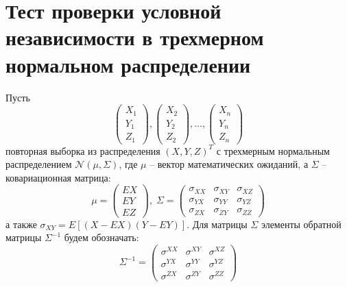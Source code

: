 \section{Тест проверки условной независимости в трехмерном нормальном распределении}
Пусть
$$
\begin{pmatrix}
    X_1\\
    Y_1 \\
    Z_1
\end{pmatrix}, \begin{pmatrix}
    X_2\\
    Y_2 \\
    Z_2
\end{pmatrix}, \ldots, 
\begin{pmatrix}
    X_n \\
    Y_n \\
    Z_n
\end{pmatrix}
$$
повторная выборка из распределения $(X,Y,Z)^T$ с трехмерным нормальным распределением $\mathcal{N}(\mu, \Sigma)$,
где $\mu$ -- вектор математических ожиданий, а $\Sigma$ -- ковариационная матрица:
$$
\mu = \begin{pmatrix}
    EX \\ EY \\ EZ
\end{pmatrix}, 
\;
\Sigma = \begin{pmatrix}
    \sigma_{XX} & \sigma_{XY} & \sigma_{XZ} \\
    \sigma_{YX} & \sigma_{YY} & \sigma_{YZ} \\
    \sigma_{ZX} & \sigma_{ZY} & \sigma_{ZZ} 
\end{pmatrix}
$$
а также $\sigma_{XY}=E[(X-EX)(Y-EY)]$.
Для матрицы $\Sigma$ элементы обратной матрицы $\Sigma^{-1}$ будем обозначать:
$$
\Sigma^{-1} =
\begin{pmatrix}
    \sigma^{XX} & \sigma^{XY} & \sigma^{XZ} \\
    \sigma^{YX} & \sigma^{YY} & \sigma^{YZ} \\
    \sigma^{ZX} & \sigma^{ZY} & \sigma^{ZZ} 
\end{pmatrix}
$$

